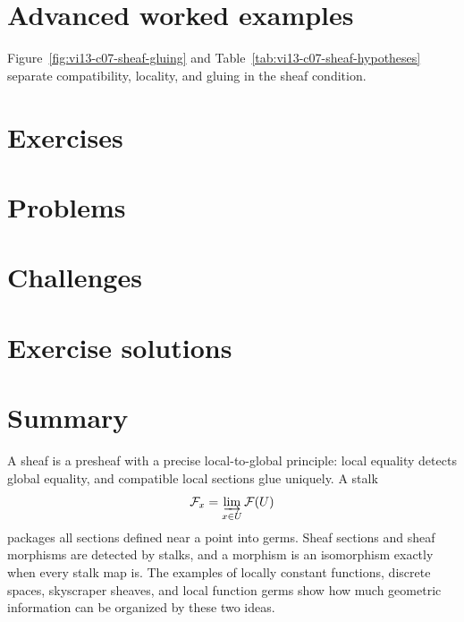 \section{Advanced worked examples}



Figure~\ref{fig:vi13-c07-sheaf-gluing} and Table~\ref{tab:vi13-c07-sheaf-hypotheses}
separate compatibility, locality, and gluing in the sheaf condition.


\section{Exercises}

\ifdefined\IncludeExerciseHints

\fi

\section{Problems}


\section{Challenges}


\ifdefined\IncludeExerciseSolutions
\section{Exercise solutions}

\fi

\section*{Summary}

A sheaf is a presheaf with a precise local-to-global principle: local equality detects global
equality, and compatible local sections glue uniquely.  A stalk
\[
\mathcal F_x=\varinjlim_{x\in U}\mathcal F(U)
\]
packages all sections defined near a point into germs.  Sheaf sections and sheaf morphisms
are detected by stalks, and a morphism is an isomorphism exactly when every stalk map is.
The examples of locally constant functions, discrete spaces, skyscraper sheaves, and local
function germs show how much geometric information can be organized by these two ideas.

